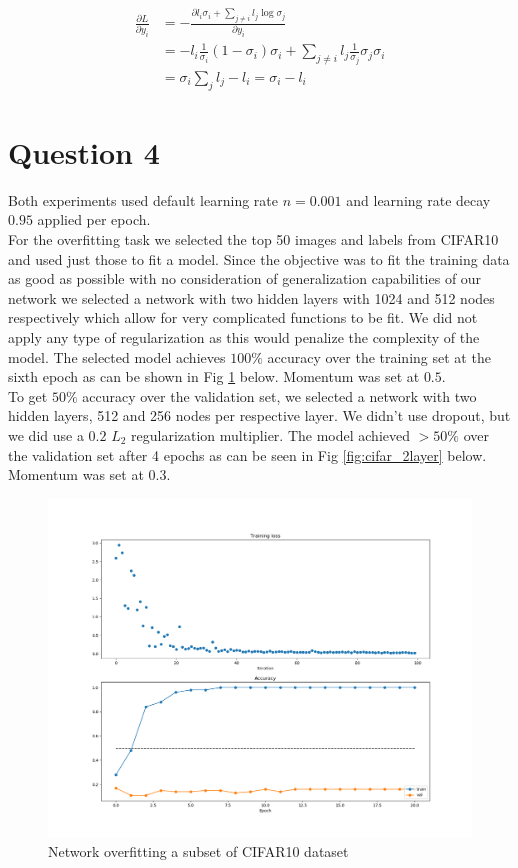 \documentclass[12pt,twoside]{article}
\begin{document}
\begin{align*}
\frac{\partial L}{\partial y_i} &= -\frac{\partial l_i \sigma_i + \sum_{j \neq i}l_j \log \sigma_j}{\partial y_i}\\
&= - l_i \frac{1}{\sigma_i} (1-\sigma_i) \sigma_i + \sum_{j \neq i} l_j \frac{1}{\sigma_j} \sigma_j \sigma_i \\
&= \sigma_i \sum_j l_j - l_i = \sigma_i - l_i
\end{align*}
\section{Question 4}
Both experiments used default learning rate $n = 0.001$ and learning rate decay $0.95$ applied per epoch.\\
For the overfitting task we selected the top 50 images and labels from CIFAR10 and used just those to fit a model. Since the objective was to fit the training data as good as possible with no consideration of generalization capabilities of our network we selected a network with two hidden layers with 1024 and 512 nodes respectively which allow for very complicated functions to be fit. We did not apply any type of regularization as this would penalize the complexity of the model. The selected model achieves $100\%$ accuracy over the training set at the sixth epoch as can be shown in Fig \ref{fig:overfit} below. Momentum was set at $0.5$.
\\

To get $50\%$ accuracy over the validation set, we selected a network with two hidden layers, 512 and 256 nodes per respective layer. We didn't use dropout, but we did use a $0.2$ $L_2$ regularization multiplier. The model achieved $>50\%$ over the validation set after 4 epochs as can be seen in Fig \ref{fig:cifar_2layer} below. Momentum was set at $0.3$.

\begin{figure}[]
\centering %
\includegraphics[width = 0.8\hsize]{./figures/overfit.png} %
\caption{Network overfitting a subset of CIFAR10 dataset} %
\label{fig:overfit} %
\end{figure}
\end{document}
